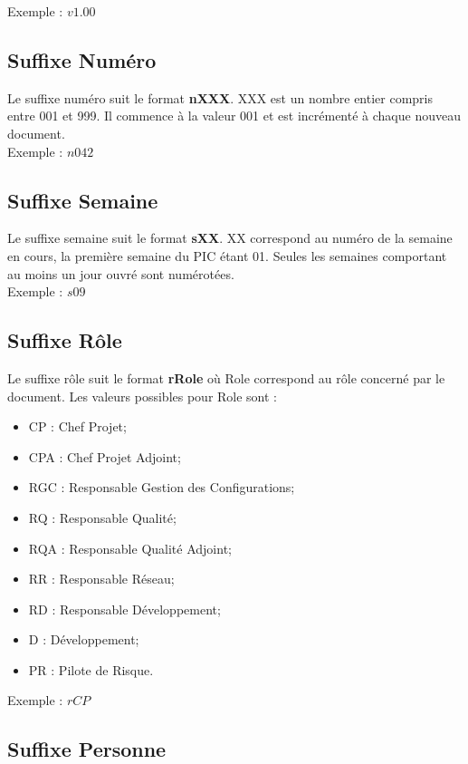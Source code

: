 Exemple : $v1.00$

\subsection{Suffixe Numéro}
\label{suffixe_numero}

Le suffixe numéro suit le format \textbf{nXXX}. XXX est un nombre entier compris entre 001 et 999. Il commence à la valeur 001 et est incrémenté à chaque nouveau document.\\

Exemple : $n042$

\subsection{Suffixe Semaine}
\label{suffixe_semaine}

Le suffixe semaine suit le format \textbf{sXX}. XX correspond au numéro de la semaine en cours, la première semaine du PIC étant 01. Seules les semaines comportant au moins un jour ouvré sont numérotées.\\

Exemple : $s09$

\subsection{Suffixe Rôle}
\label{suffixe_role}

Le suffixe rôle suit le format \textbf{rRole} où Role correspond au rôle concerné par le document. Les valeurs possibles pour Role sont : 
\begin{itemize}
\item CP : Chef Projet;
\item CPA : Chef Projet Adjoint;
\item RGC : Responsable Gestion des Configurations;
\item RQ : Responsable Qualité;
\item RQA : Responsable Qualité Adjoint;
\item RR : Responsable Réseau;
\item RD : Responsable Développement;
\item D : Développement;
\item PR : Pilote de Risque.
\end{itemize}

Exemple : $rCP$

\subsection{Suffixe Personne}
\label{suffixe_personne}

